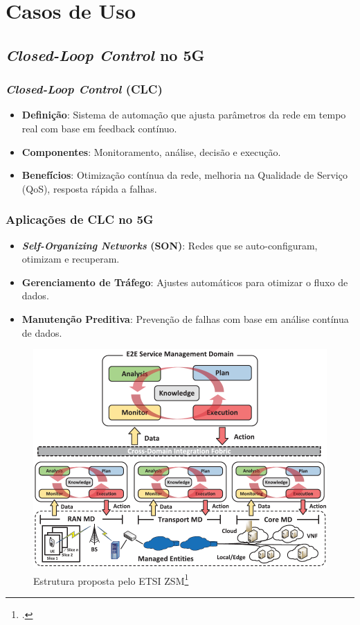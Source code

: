 
\section{Casos de Uso}
\subsection{\textit{Closed-Loop Control} no 5G}
\begin{frame}
    \frametitle{\textit{Closed-Loop Control} (CLC)}
    \begin{itemize}
        \item \textbf{Definição}: Sistema de automação que ajusta parâmetros da rede em tempo real com base em feedback contínuo.
        \item \textbf{Componentes}: Monitoramento, análise, decisão e execução.
        \item \textbf{Benefícios}: Otimização contínua da rede, melhoria na Qualidade de Serviço (QoS), resposta rápida a falhas.
    \end{itemize}
\end{frame}

\begin{frame}
    \frametitle{Aplicações de CLC no 5G}
    \begin{itemize}
        \item \textbf{\textit{Self-Organizing Networks} (SON)}: Redes que se auto-configuram, otimizam e recuperam.
        \item \textbf{Gerenciamento de Tráfego}: Ajustes automáticos para otimizar o fluxo de dados.
        \item \textbf{Manutenção Preditiva}: Prevenção de falhas com base em análise contínua de dados.
    \end{itemize}
    \begin{figure}
        \centering
        \includegraphics[width=0.45\linewidth]{figs/CLC_example.png}
        \caption{Estrutura proposta pelo ETSI ZSM\footcite{CLC_example}}
    \end{figure}
\end{frame}

